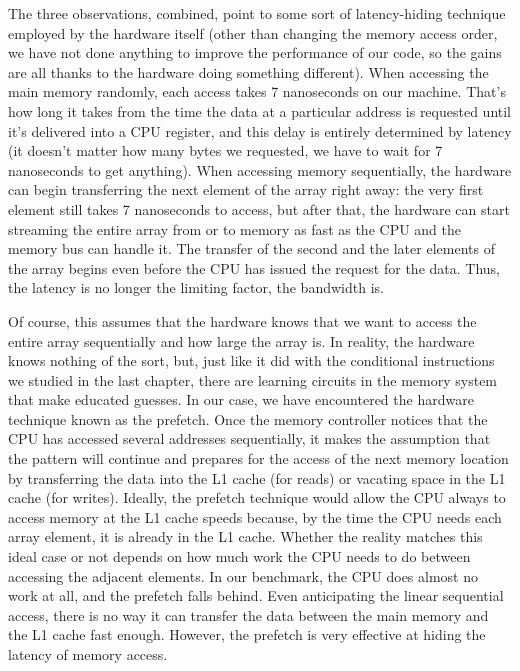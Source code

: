 The three observations, combined, point to some sort of latency-hiding technique employed by the hardware itself (other than changing the memory access order, we have not done anything to improve the performance of our code, so the gains are all thanks to the hardware doing something different). When accessing the main memory randomly, each access takes 7 nanoseconds on our machine. That's how long it takes from the time the data at a particular address is requested until it's delivered into a CPU register, and this delay is entirely determined by latency (it doesn't matter how many bytes we requested, we have to wait for 7 nanoseconds to get anything). When accessing memory sequentially, the hardware can begin transferring the next element of the array right away: the very first element still takes 7 nanoseconds to access, but after that, the hardware can start streaming the entire array from or to memory as fast as the CPU and the memory bus can handle it. The transfer of the second and the later elements of the array begins even before the CPU has issued the request for the data. Thus, the latency is no longer the limiting factor, the bandwidth is.

Of course, this assumes that the hardware knows that we want to access the entire array sequentially and how large the array is. In reality, the hardware knows nothing of the sort, but, just like it did with the conditional instructions we studied in the last chapter, there are learning circuits in the memory system that make educated guesses. In our case, we have encountered the hardware technique known as the prefetch. Once the memory controller notices that the CPU has accessed several addresses sequentially, it makes the assumption that the pattern will continue and prepares for the access of the next memory location by transferring the data into the L1 cache (for reads) or vacating space in the L1 cache (for writes). Ideally, the prefetch technique would allow the CPU always to access memory at the L1 cache speeds because, by the time the CPU needs each array element, it is already in the L1 cache. Whether the reality matches this ideal case or not depends on how much work the CPU needs to do between accessing the adjacent elements. In our benchmark, the CPU does almost no work at all, and the prefetch falls behind. Even anticipating the linear sequential access, there is no way it can transfer the data between the main memory and the L1 cache fast enough. However, the prefetch is very effective at hiding the latency of memory access.

